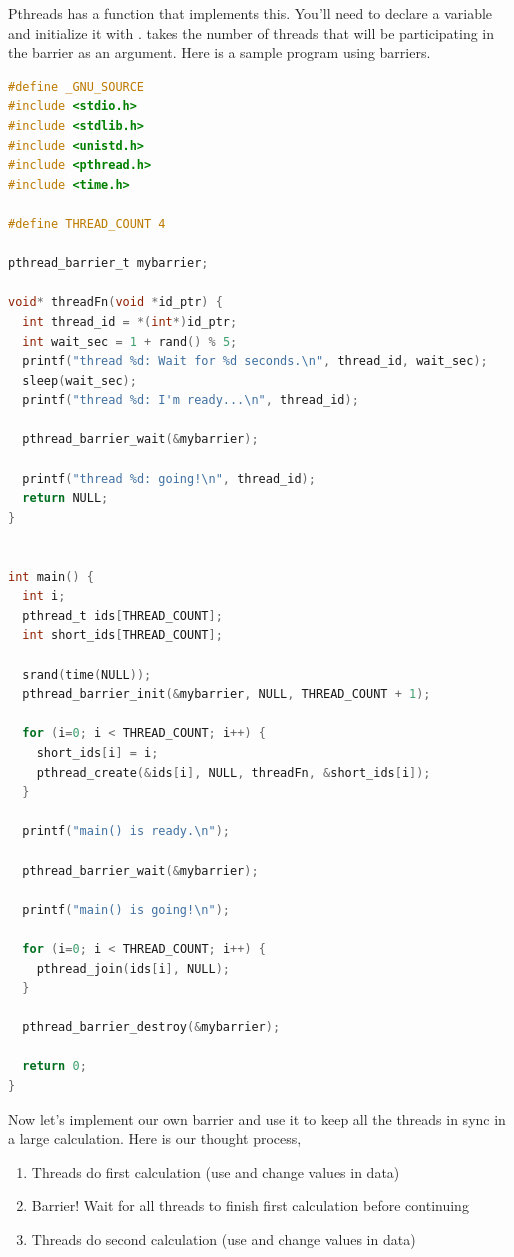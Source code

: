 Pthreads has a function  that implements this.
You'll need to declare a  variable and initialize it with .
 takes the number of threads that will be participating in the barrier as an argument.
Here is a sample program using barriers.

\begin{lstlisting}[language=C]
#define _GNU_SOURCE
#include <stdio.h>
#include <stdlib.h>
#include <unistd.h>
#include <pthread.h>
#include <time.h>

#define THREAD_COUNT 4

pthread_barrier_t mybarrier;

void* threadFn(void *id_ptr) {
  int thread_id = *(int*)id_ptr;
  int wait_sec = 1 + rand() % 5;
  printf("thread %d: Wait for %d seconds.\n", thread_id, wait_sec);
  sleep(wait_sec);
  printf("thread %d: I'm ready...\n", thread_id);

  pthread_barrier_wait(&mybarrier);

  printf("thread %d: going!\n", thread_id);
  return NULL;
}


int main() {
  int i;
  pthread_t ids[THREAD_COUNT];
  int short_ids[THREAD_COUNT];

  srand(time(NULL));
  pthread_barrier_init(&mybarrier, NULL, THREAD_COUNT + 1);

  for (i=0; i < THREAD_COUNT; i++) {
    short_ids[i] = i;
    pthread_create(&ids[i], NULL, threadFn, &short_ids[i]);
  }

  printf("main() is ready.\n");

  pthread_barrier_wait(&mybarrier);

  printf("main() is going!\n");

  for (i=0; i < THREAD_COUNT; i++) {
    pthread_join(ids[i], NULL);
  }

  pthread_barrier_destroy(&mybarrier);

  return 0;
}
\end{lstlisting}

Now let's implement our own barrier and use it to keep all the threads in sync in a large calculation.
Here is our thought process,

\begin{enumerate}
\item Threads do first calculation (use and change values in data)
\item Barrier! Wait for all threads to finish first calculation before continuing
\item Threads do second calculation (use and change values in data)
\end{enumerate}

